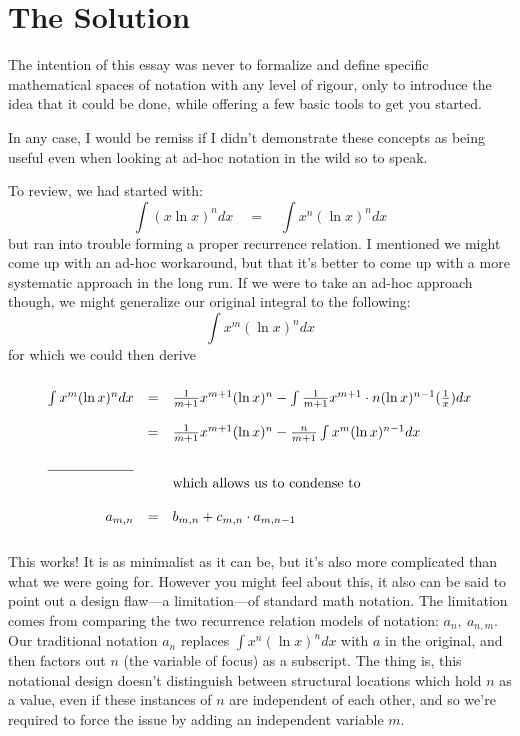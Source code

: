 \documentclass[twoside]{article}
\begin{document}
\section*{The Solution} %

The intention of this essay was never to formalize and define specific mathematical spaces of notation with any level of
rigour, only to introduce the idea that it could be done, while offering a few basic tools to get you started.

In any case, I would be remiss if I didn't demonstrate these concepts as being useful even when looking at ad-hoc notation
in the wild so to speak.

To review, we had started with:
$$ \int (x\ln x)^n dx\quad=\quad\int x^n(\ln x)^n dx $$
but ran into trouble forming a proper recurrence relation. I mentioned we might come up with an ad-hoc workaround,
but that it's better to come up with a more systematic approach in the long run. If we were to take an ad-hoc approach though,
we might generalize our original integral to the following:
$$ \int x^m(\ln x)^n dx $$
for which we could then derive
$$ \begin{array}{rcl}
																\\
\int x^m(\ln x)^n dx	& = & \frac{1}{m+1}x^{m+1}(\ln x)^n - \int\frac{1}{m+1}x^{m+1}\cdot n(\ln x)^{n-1}(\frac{1}{x}) dx	\\
																\\
			& = & \frac{1}{m+1}x^{m+1}(\ln x)^n - \frac{n}{m+1}\int x^m(\ln x)^{n-1} dx				\\
																\\
\hrulefill
																\\
			&   & \mbox{which allows us to condense to}								\\
																\\
a_{m,n}			& = & b_{m,n} + c_{m,n}\cdot a_{m,n-1}									\\
																\\
\end{array} $$
This works! It is as minimalist as it can be, but it's also more complicated than what we were going for. However you might
feel about this, it also can be said to point out a design flaw---a limitation---of standard math notation. The limitation
comes from comparing the two recurrence relation models of notation: $ a_n,\ a_{n,m} $. Our traditional notation $ a_n $
replaces $ \int x^n(\ln x)^n dx $ with $ a $ in the original, and then factors out $ n $ (the variable of focus) as a
subscript.  The thing is, this notational design doesn't distinguish between structural locations which hold $ n $
as a value, even if these instances of $ n $ are independent of each other, and so we're required to force the issue
by adding an independent variable $ m $.
\end{document}
